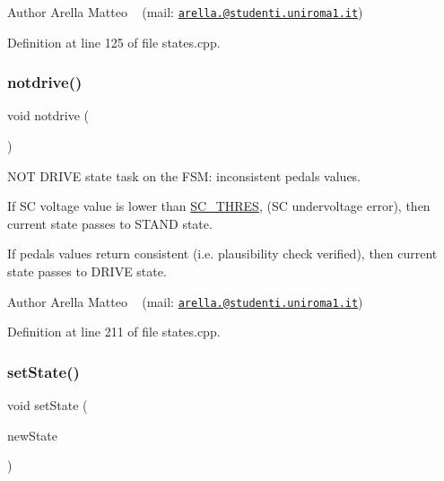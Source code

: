\begin{DoxyAuthor}{Author}
Arella Matteo ~\newline
 (mail\+: \href{mailto:arella.1646983@studenti.uniroma1.it}{\tt arella.@studenti.\+uniroma1.\+it}) 
\end{DoxyAuthor}


Definition at line 125 of file states.\+cpp.

\mbox{\label{group__stages__group_ga3ac5d1576c7d3ef76c2dfe724d4849fa}} 
\subsubsection{\texorpdfstring{notdrive()}{notdrive()}}
{\footnotesize\ttfamily void notdrive (\begin{DoxyParamCaption}{ }\end{DoxyParamCaption})}



N\+OT D\+R\+I\+VE state task on the F\+SM\+: inconsistent pedals values. 

If SC voltage value is lower than \mbox{\hyperlink{group__stages__group_ga9688af4f17ae88b4d149269d71b7ff1f}{S\+C\+\_\+\+T\+H\+R\+ES}}, (SC undervoltage error), then current state passes to S\+T\+A\+ND state.

If pedals values return consistent (i.\+e. plausibility check verified), then current state passes to D\+R\+I\+VE state.

\begin{DoxyAuthor}{Author}
Arella Matteo ~\newline
 (mail\+: \href{mailto:arella.1646983@studenti.uniroma1.it}{\tt arella.@studenti.\+uniroma1.\+it}) 
\end{DoxyAuthor}


Definition at line 211 of file states.\+cpp.

\mbox{\label{group__stages__group_ga47cb7615bbcf2c96cc4a7656f9a76bab}} 
\subsubsection{\texorpdfstring{set\+State()}{setState()}}
{\footnotesize\ttfamily void set\+State (\begin{DoxyParamCaption}\item[{\mbox{\hyperlink{group__stages__group_ga29e04432d3efcac24a5ae62572a6e8f2}{e\+\_\+node\+State}}}]{new\+State }\end{DoxyParamCaption})}



